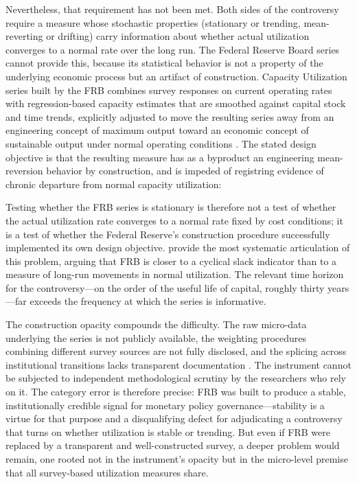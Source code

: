 \documentclass[11pt,a4paper]{article}
\begin{document}
Nevertheless, that requirement has not been met. Both sides of the controversy require a measure whose stochastic properties (stationary or trending, mean-reverting or drifting) carry information about whether actual utilization converges to a normal rate over the long run. The Federal Reserve Board series cannot provide this, because its statistical behavior is not a property of the underlying economic process but an artifact of construction. Capacity Utilization series built by the FRB combines survey responses on current operating
rates with regression-based capacity estimates that are smoothed against capital stock and time trends, explicitly adjusted to move the resulting series away from an engineering concept of maximum output toward an economic concept of sustainable output under normal operating conditions \citep{Shapiro1989}. The stated design objective is that
the resulting measure has as a byproduct an engineering mean-reversion behavior by construction, and is impeded of registring evidence of chronic departure from normal capacity utilization: 

Testing whether the FRB series is stationary is therefore not a test of whether the actual utilization rate converges to a normal rate fixed by cost conditions; it is a test of whether the Federal Reserve's construction procedure successfully implemented its own design objective. \citet{Nikiforos2016,Nikiforos2021} provide the most
systematic articulation of this problem, arguing that FRB is closer to a cyclical slack indicator than to a measure of long-run movements in normal utilization. The relevant time horizon for the controversy---on the order of the useful life of capital, roughly thirty years---far exceeds the frequency at which the series is informative.

The construction opacity compounds the difficulty. The raw micro-data underlying the series is not publicly available, the weighting procedures combining different survey sources are not fully disclosed,
and the splicing across institutional transitions lacks transparent documentation \citep{Board2017}. The instrument cannot be subjected to independent methodological scrutiny by the researchers who rely on it. The category error is therefore precise: FRB was built to produce a stable, institutionally credible signal for monetary policy governance---stability is a virtue for that purpose and a disqualifying defect for adjudicating a controversy that turns on whether utilization is stable or trending. But even if FRB were replaced by a transparent and well-constructed survey, a deeper problem would remain, one rooted not in the instrument's opacity but in the micro-level premise that all survey-based utilization measures share.
\end{document}

